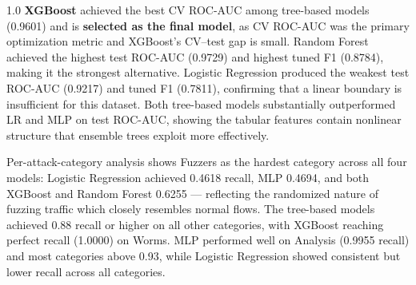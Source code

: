 \begin{spacing}{1.0}
\textbf{XGBoost} achieved the best CV ROC-AUC among tree-based models (0.9601)
and is \textbf{selected as the final model}, as CV ROC-AUC was the primary
optimization metric and XGBoost's CV--test gap is small. Random Forest achieved
the highest test ROC-AUC (0.9729) and highest tuned F1 (0.8784), making it the
strongest alternative. Logistic Regression produced the weakest test ROC-AUC
(0.9217) and tuned F1 (0.7811), confirming that a linear boundary is
insufficient for this dataset. Both tree-based models substantially outperformed
LR and MLP on test ROC-AUC, showing the tabular features contain nonlinear
structure that ensemble trees exploit more effectively.

Per-attack-category analysis shows Fuzzers as the hardest category across all
four models: Logistic Regression achieved 0.4618 recall, MLP 0.4694, and both
XGBoost and Random Forest 0.6255 --- reflecting the randomized nature of fuzzing
traffic which closely resembles normal flows. The tree-based models achieved
0.88 recall or higher on all other categories, with XGBoost reaching perfect
recall (1.0000) on Worms. MLP performed well on Analysis (0.9955 recall) and
most categories above 0.93, while Logistic Regression showed consistent but
lower recall across all categories.

\end{spacing}
